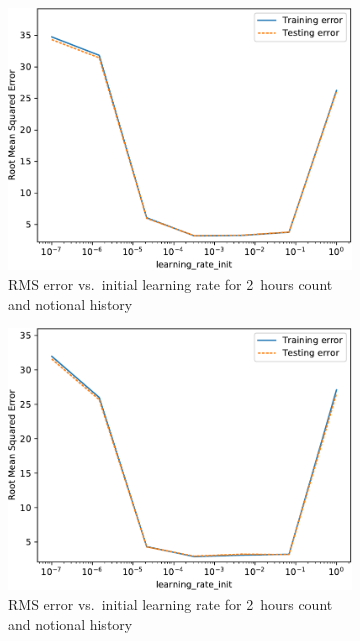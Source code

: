 \begin{figure}[!ht]
\begin{subfigure}[t]{.47\linewidth}
        \includegraphics[width=0.9\linewidth]{./figures/AplotB5.pdf}
        \caption{RMS error vs.~initial learning rate for 2~hours count and notional history}\label{AppAplotB5}
    \end{subfigure}\hfill%
    \begin{subfigure}[t]{.47\linewidth}\centering
        \includegraphics[width=0.9\linewidth]{./figures/AplotB6.pdf}
        \caption{RMS error vs.~initial learning rate for 2~hours count and notional history}\label{AppAplotB6}
    \end{subfigure}\\[5pt]
    \begin{subfigure}[t]{.47\linewidth}\centering

\end{subfigure}
\end{figure}
